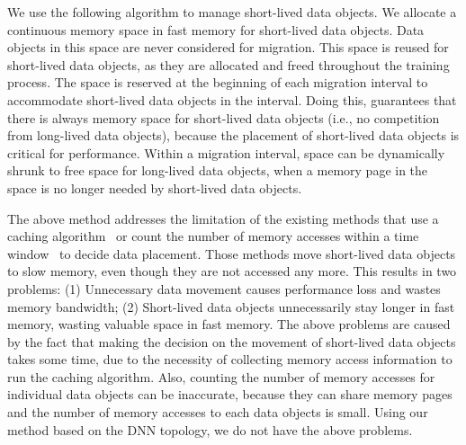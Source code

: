 We use the following algorithm to manage short-lived data objects. We allocate a continuous memory space in fast memory for short-lived data objects. Data objects in this space are never considered for migration. This space is reused for short-lived data objects, as they are allocated and freed 
throughout the training process. The space is %
\textcolor{dong2}{reserved} at the beginning of each migration interval to accommodate short-lived data objects in the interval. Doing this, \name guarantees that there is always memory space for short-lived data objects (i.e., no competition from long-lived data objects), because the placement of short-lived data objects is critical for performance. 
Within a migration interval, space can be dynamically shrunk to free space for long-lived data objects, when a memory page in the space %
is no longer needed by short-lived data objects.


The above method addresses the limitation of the existing methods that use a caching algorithm~\cite{Ramos:ics11, RAMinate:socc16, 5260554, Yan:ASPLOS19, heteros:isca17} or count the number of memory accesses within a time window~\cite{Thermostat:asplos17, unimem:sc17}  \textcolor{check}{to decide data placement}. Those methods move short-lived data objects to slow memory, even though they are not accessed any more. This results in two problems: (1) Unnecessary data movement causes performance loss and wastes memory bandwidth; (2) Short-lived data objects unnecessarily stay longer in fast memory, wasting valuable space in fast memory. The above problems are caused by the fact that making the decision on the movement of short-lived data objects takes some time, due to the necessity of collecting memory access information to run the caching algorithm. Also, counting the number of memory accesses for individual data objects can be inaccurate, because they can share memory pages and the number of memory accesses to each data objects is small. \textcolor{check}{Using our method based on the DNN topology, we do not have the above problems.} 


